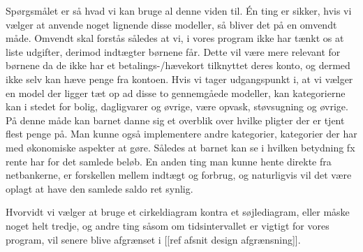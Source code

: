 Spørgsmålet er så hvad vi kan bruge al denne viden til. Én ting er sikker, hvis vi vælger at anvende noget lignende disse modeller, så bliver det på en omvendt måde. Omvendt skal forstås således at vi, i vores program ikke har tænkt os at liste udgifter, derimod indtægter børnene får. Dette vil være mere relevant for børnene da de ikke har et betalings-/hævekort tilknyttet deres konto, og dermed ikke selv kan hæve penge fra kontoen. Hvis vi tager udgangspunkt i, at vi vælger en model der ligger tæt op ad disse to gennemgåede modeller, kan kategorierne kan i stedet for bolig, dagligvarer og øvrige, være opvask, støvsugning og øvrige. På denne måde kan barnet danne sig et overblik over hvilke pligter der er tjent flest penge på. Man kunne også implementere andre kategorier, kategorier der har med økonomiske aspekter at gøre. Således at barnet kan se i hvilken betydning fx rente har for det samlede beløb. En anden ting man kunne hente direkte fra netbankerne, er forskellen mellem indtægt og forbrug, og naturligvis vil det være oplagt at have den samlede saldo ret synlig. 

Hvorvidt vi vælger at bruge et cirkeldiagram kontra et søjlediagram, eller måske noget helt tredje, og andre ting såsom om tidsintervallet er vigtigt for vores program, vil senere blive afgrænset i [[ref afsnit design afgrænsning]].


















